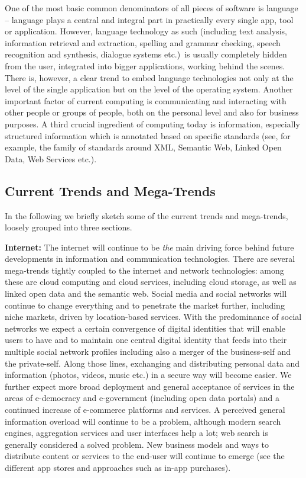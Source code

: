 \documentclass[10pt, plain]{../../metanetpaper}
\begin{document}
\begin{multicols}{2}
One of the most basic common denominators of all pieces of software is language -- language plays a central and integral part in practically every single app, tool or application. However, language technology as such (including text analysis, information retrieval and extraction, spelling and grammar checking, speech recognition and synthesis, dialogue systems etc.)~is usually completely hidden from the user, integrated into bigger applications, working behind the scenes. There is, however, a clear trend to embed language technologies not only at the level of the single application but on the level of the operating system. Another important factor of current computing is communicating and interacting with other people or groups of people, both on the personal level and also for business purposes.  A third crucial ingredient of computing today is information, especially structured information which is annotated based on specific standards (see, for example, the family of standards around XML, Semantic Web, Linked Open Data, Web Services etc.).

\subsection{Current Trends and Mega-Trends}
\label{sec:major-trends}

In the following we briefly sketch some of the current trends and mega-trends, loosely grouped into three sections.

\textbf{Internet:} The internet will continue to be \emph{the} main driving force behind future developments in information and communication technologies. There are several mega-trends tightly coupled to the internet and network technologies: among these are cloud computing and cloud services, including cloud storage, as well as linked open data and the semantic web. Social media and social networks will continue to change everything and to penetrate the market further, including niche markets, driven by location-based services. With the predominance of social networks we expect a certain convergence of digital identities that will enable users to have and to maintain one central digital identity that feeds into their multiple social network profiles including also a merger of the business-self and the private-self. Along those lines, exchanging and distributing personal data and information (photos, videos, music etc.) in a secure way will become easier. We further expect more broad deployment and general acceptance of services in the areas of e-democracy and e-government (including open data portals) and a continued increase of e-commerce platforms and services. A perceived general information overload will continue to be a problem, although modern search engines, aggregation services and user interfaces help a lot; web search is generally considered a solved problem. New business models and ways to distribute content or services to the end-user will continue to emerge (see the different app stores and approaches such as in-app purchases).


\end{multicols}
\end{document}
